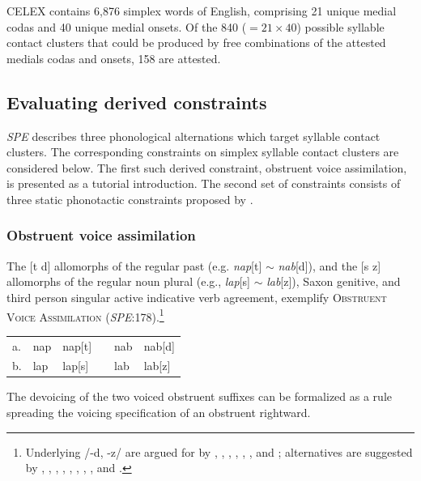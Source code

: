 CELEX contains 6,876 simplex words of English, comprising 21 unique medial codas and 40 unique medial onsets. Of the 840 ($= 21 \times 40$) possible syllable contact clusters that could be produced by free combinations of the attested medials codas and onsets, 158 are attested.

\subsection{Evaluating derived constraints}

\emph{SPE} describes three phonological alternations which target syllable contact clusters. The corresponding constraints on simplex syllable contact clusters are considered below. The first such derived constraint, obstruent voice assimilation, is presented as a tutorial introduction. The second set of constraints consists of three static phonotactic constraints proposed by \citet{Pierrehumbert1994}.

\subsubsection{Obstruent voice assimilation} 
\label{ova}

The [t \alt{} d] allomorphs of the regular past (e.g. \emph{nap}[t] $\sim$ \emph{nab}[d]), and the [s \alt{} z] allomorphs of the regular noun plural (e.g., \emph{lap}[s] $\sim$ \emph{lab}[z]), Saxon genitive, and third person singular active indicative verb agreement, exemplify \textsc{Obstruent Voice Assimilation} (\emph{SPE}:178).\footnote{Underlying /-d, -z/ are argued for by \citet[282]{Hockett1958}, \citet[210]{SPE}, \citet{Basboll1972}, \citet{Shibatani1972}, \citet{Anderson1973a}, \citet[102]{Pinker1988}, and \citet[284f.]{Bakovic2005b}; alternatives are suggested by \citet[210f.]{LANGUAGE}, \citet[426]{Nida1948}, \citet{Luelsdorff1969}, \citet{Lightner1970}, \citet{Hoard1971}, \citet{Miner1975}, \citet{Zwicky1975}, \citet{Kiparsky1985}, and \citet[135]{Borowsky1986}.}

\begin{example}
\begin{tabular}{l l l l l l}
a. & {nap} & {nap}[t] & & {nab} & {nab}[d] \\
b. & {lap} & {lap}[s] & & {lab} & {lab}[z] \\
\end{tabular}
\end{example}

\noindent The devoicing of the two voiced obstruent suffixes can be formalized as a 
rule spreading the voicing specification of an obstruent rightward.

